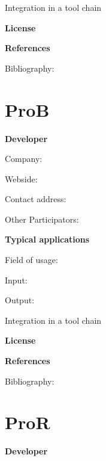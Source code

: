 \documentclass{./template/openetcs2}
\begin{document}
	Integration in a tool chain



	\textbf{License}


	\textbf{References}

	Bibliography:


\section{ProB}

	\textbf{Developer}

	Company: 

	Webside:

	Contact address:

	Other  Participators:



	\textbf{Typical applications}

	Field of usage:


	Input:

	Output:





	Integration in a tool chain



	\textbf{License}


	\textbf{References}

	Bibliography:


\section{ProR}

	\textbf{Developer}
\end{document}
